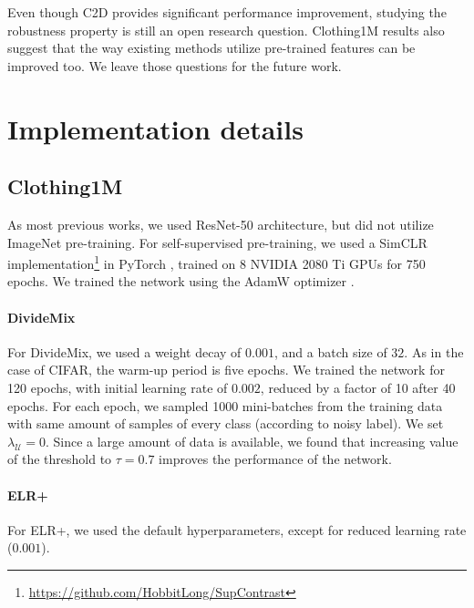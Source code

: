 \documentclass[10pt,twocolumn,letterpaper]{article}
\renewcommand{\cite}[1]{\citep{#1}}
\begin{document}
Even though C2D provides significant performance improvement, studying the robustness property is still an open research question.  Clothing1M results also suggest that the way existing methods utilize pre-trained features can be improved too. We leave those questions for the future work.

 
{\small


}


\appendix{}

\renewcommand\thefigure{\thesection.\arabic{figure}} 
\renewcommand\thetable{\thesection.\arabic{table}} 
\renewcommand\theequation{\thesection.\arabic{equation}}  
\setcounter{figure}{0}  
\setcounter{table}{0}


\section{Implementation details}
\subsection{Clothing1M}

As most previous works, we used ResNet-50 architecture, but did not utilize ImageNet pre-training.
For self-supervised pre-training, we used a SimCLR implementation\footnote{\url{https://github.com/HobbitLong/SupContrast}} in PyTorch \cite{paszke2019pytorch}, trained on 8 NVIDIA 2080 Ti GPUs for 750 epochs. We trained the network using the AdamW optimizer \cite{loshchilov2017decoupled}.

\paragraph{DivideMix}
For DivideMix, we used a weight decay of $0.001$, and a batch size of $32$. As in the case of CIFAR, the warm-up period is five epochs. We trained the network for 120 epochs, with initial learning rate of $0.002$, reduced by a factor of 10 after 40 epochs. For each epoch, we sampled 1000 mini-batches from the training data with same amount of samples of every class (according to noisy label). 
We set $\lambda_{\mathcal{U}}=0$. Since a large amount of data is available, we found that increasing value of the threshold to $\tau=0.7$ improves the performance of the network.

\paragraph{ELR+}
For ELR+, we used the default hyperparameters, except for reduced learning rate ($0.001$).
\end{document}
